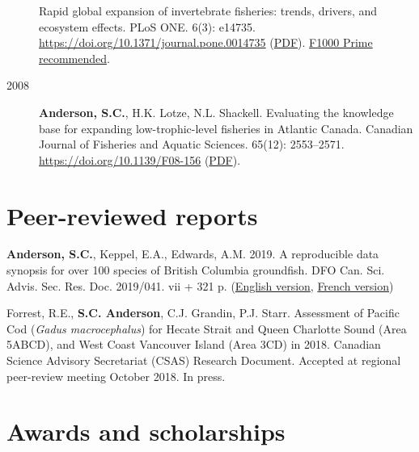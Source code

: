 \begin{description}
Rapid global expansion of invertebrate fisheries: trends, drivers, and
ecosystem effects. PLoS ONE. 6(3): e14735.
\url{https://doi.org/10.1371/journal.pone.0014735}
(\href{http://www.plosone.org/article/fetchObject.action?uri=info\%3Adoi\%2F10.1371\%2Fjournal.pone.0014735\&representation=PDF}{PDF}).
\href{https://f1000.com/prime/9542957}{F1000 Prime recommended}.
\item[2008]
\textbf{Anderson, S.C.}, H.K. Lotze, N.L. Shackell. Evaluating the
knowledge base for expanding low-trophic-level fisheries in Atlantic
Canada. Canadian Journal of Fisheries and Aquatic Sciences. 65(12):
2553--2571. \url{https://doi.org/10.1139/F08-156}
(\href{https://www.dropbox.com/s/b0la81jbqitib6u/Anderson_etal_2008_knowledge.pdf?dl=1}{PDF}).
\end{description}

\hypertarget{peer-reviewed-reports}{%
\section{Peer-reviewed reports}\label{peer-reviewed-reports}}

\begin{description}
\tightlist
\item[2019]
\textbf{Anderson, S.C.}, Keppel, E.A., Edwards, A.M. 2019. A
reproducible data synopsis for over 100 species of British Columbia
groundfish. DFO Can. Sci. Advis. Sec. Res. Doc. 2019/041. vii + 321 p.
(\href{http://www.dfo-mpo.gc.ca/csas-sccs/Publications/ResDocs-DocRech/2019/2019_041-eng.html}{English
version},
\href{http://www.dfo-mpo.gc.ca/csas-sccs/Publications/ResDocs-DocRech/2019/2019_041-fra.html}{French
version})
\item[2018]
Forrest, R.E., \textbf{S.C. Anderson}, C.J. Grandin, P.J. Starr.
Assessment of Pacific Cod (\emph{Gadus macrocephalus}) for Hecate Strait
and Queen Charlotte Sound (Area 5ABCD), and West Coast Vancouver Island
(Area 3CD) in 2018. Canadian Science Advisory Secretariat (CSAS)
Research Document. Accepted at regional peer-review meeting October
2018. In press.
\end{description}

\hypertarget{awards-and-scholarships}{%
\section{Awards and scholarships}\label{awards-and-scholarships}}

